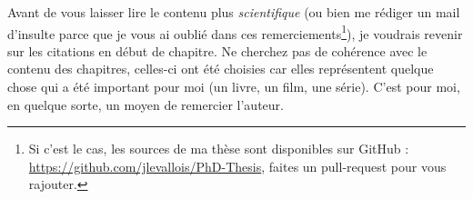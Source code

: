 Avant de vous laisser lire le contenu plus \emph{scientifique} (ou bien me
rédiger un mail d'insulte parce que je vous ai oublié dans ces
remerciements\footnote{Si c'est le cas, les sources de ma thèse sont disponibles
sur GitHub : \url{https://github.com/jlevallois/PhD-Thesis}, faites un
pull-request pour vous rajouter.}), je voudrais revenir sur les citations en
début de chapitre. Ne cherchez pas de cohérence avec le contenu des chapitres,
celles-ci ont été choisies car elles représentent quelque chose qui a été
important pour moi (un livre, un film, une série). C'est pour moi, en quelque
sorte, un moyen de remercier l'auteur.
